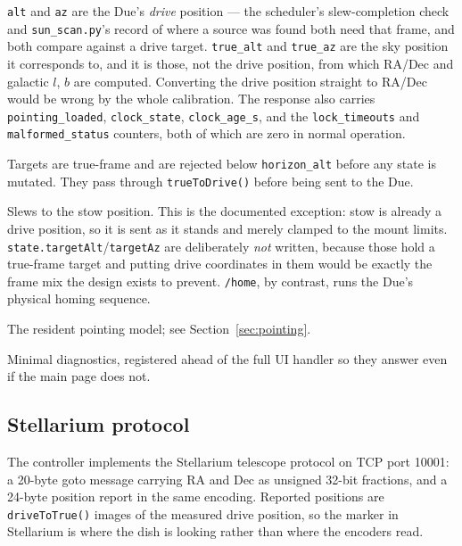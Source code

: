 \documentclass[11pt,a4paper]{article}
\begin{document}
\begin{description}[style=nextline]
    \item[\texttt{/status}] \texttt{alt} and \texttt{az} are the Due's \emph{drive} position --- the scheduler's slew-completion check and \texttt{sun\_scan.py}'s record of where a source was found both need that frame, and both compare against a drive target. \texttt{true\_alt} and \texttt{true\_az} are the sky position it corresponds to, and it is those, not the drive position, from which RA/Dec and galactic $l$, $b$ are computed. Converting the drive position straight to RA/Dec would be wrong by the whole calibration. The response also carries \texttt{pointing\_loaded}, \texttt{clock\_state}, \texttt{clock\_age\_s}, and the \texttt{lock\_timeouts} and \texttt{malformed\_status} counters, both of which are zero in normal operation.
    \item[\texttt{/goto}, \texttt{/track/*}, \texttt{/direct}] Targets are true-frame and are rejected below \texttt{horizon\_alt} before any state is mutated. They pass through \texttt{trueToDrive()} before being sent to the Due.
    \item[\texttt{/go-home}] Slews to the stow position. This is the documented exception: stow is already a drive position, so it is sent as it stands and merely clamped to the mount limits. \texttt{state.targetAlt}/\texttt{targetAz} are deliberately \emph{not} written, because those hold a true-frame target and putting drive coordinates in them would be exactly the frame mix the design exists to prevent. \texttt{/home}, by contrast, runs the Due's physical homing sequence.
    \item[\texttt{/pointing}, \texttt{/pointing/apply}, \texttt{/pointing/clear}] The resident pointing model; see Section~\ref{sec:pointing}.
    \item[\texttt{/ping}, \texttt{/network}] Minimal diagnostics, registered ahead of the full UI handler so they answer even if the main page does not.
\end{description}

\subsection{Stellarium protocol}

The controller implements the Stellarium telescope protocol on TCP port 10001: a 20-byte goto message carrying RA and Dec as unsigned 32-bit fractions, and a 24-byte position report in the same encoding. Reported positions are \texttt{driveToTrue()} images of the measured drive position, so the marker in Stellarium is where the dish is looking rather than where the encoders read.
\end{document}
